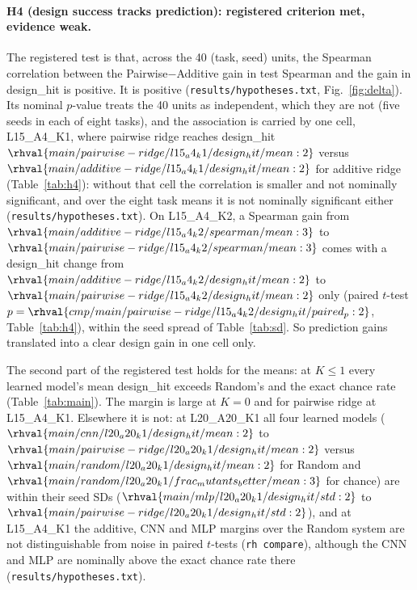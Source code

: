 \paragraph{H4 (design success tracks prediction): registered criterion met, evidence weak.} The registered test is that, across the 40 (task, seed) units, the Spearman correlation between the Pairwise$-$Additive gain in test Spearman and the gain in design\_hit is positive. It is positive (\texttt{results/hypotheses.txt}, Fig.~\ref{fig:delta}). Its nominal $p$-value treats the 40 units as independent, which they are not (five seeds in each of eight tasks), and the association is carried by one cell, L15\_A4\_K1, where pairwise ridge reaches design\_hit $\rhval{main/pairwise-ridge/l15_a4_k1/design_hit/mean:2}$ versus $\rhval{main/additive-ridge/l15_a4_k1/design_hit/mean:2}$ for additive ridge (Table~\ref{tab:h4}): without that cell the correlation is smaller and not nominally significant, and over the eight task means it is not nominally significant either (\texttt{results/hypotheses.txt}). On L15\_A4\_K2, a Spearman gain from $\rhval{main/additive-ridge/l15_a4_k2/spearman/mean:3}$ to $\rhval{main/pairwise-ridge/l15_a4_k2/spearman/mean:3}$ comes with a design\_hit change from $\rhval{main/additive-ridge/l15_a4_k2/design_hit/mean:2}$ to $\rhval{main/pairwise-ridge/l15_a4_k2/design_hit/mean:2}$ only (paired $t$-test $p=\rhval{cmp/main/pairwise-ridge/l15_a4_k2/design_hit/paired_p:2}$, Table~\ref{tab:h4}), within the seed spread of Table~\ref{tab:sd}. So prediction gains translated into a clear design gain in one cell only.

The second part of the registered test holds for the means: at $K\le1$ every learned model's mean design\_hit exceeds Random's and the exact chance rate (Table~\ref{tab:main}). The margin is large at $K=0$ and for pairwise ridge at L15\_A4\_K1. Elsewhere it is not: at L20\_A20\_K1 all four learned models ($\rhval{main/cnn/l20_a20_k1/design_hit/mean:2}$ to $\rhval{main/pairwise-ridge/l20_a20_k1/design_hit/mean:2}$ versus $\rhval{main/random/l20_a20_k1/design_hit/mean:2}$ for Random and $\rhval{main/random/l20_a20_k1/frac_mutants_better/mean:3}$ for chance) are within their seed SDs ($\rhval{main/mlp/l20_a20_k1/design_hit/std:2}$ to $\rhval{main/pairwise-ridge/l20_a20_k1/design_hit/std:2}$), and at L15\_A4\_K1 the additive, CNN and MLP margins over the Random system are not distinguishable from noise in paired $t$-tests (\texttt{rh compare}), although the CNN and MLP are nominally above the exact chance rate there (\texttt{results/hypotheses.txt}).

